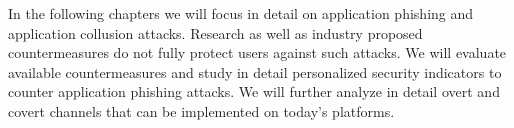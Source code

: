 In the following chapters we will focus in detail on application phishing and application collusion attacks. Research as well as industry proposed countermeasures do not fully protect users against such attacks. We will evaluate available countermeasures and study in detail personalized security indicators to counter application phishing attacks. We will further analyze in detail overt and covert channels that can be implemented on today's platforms.